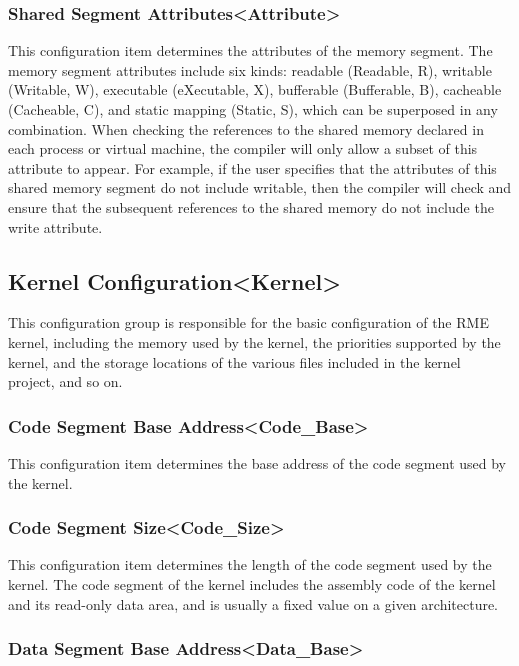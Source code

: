 \subsubsection{Shared Segment Attributes<Attribute>{}}\label{subsubsec:5-3-11-6}

This configuration item determines the attributes of the memory segment. The memory segment attributes include six kinds: readable (Readable, R), writable (Writable, W), executable (eXecutable, X), bufferable (Bufferable, B), cacheable (Cacheable, C), and static mapping (Static, S), which can be superposed in any combination. When checking the references to the shared memory declared in each process or virtual machine, the compiler will only allow a subset of this attribute to appear. For example, if the user specifies that the attributes of this shared memory segment do not include writable, then the compiler will check and ensure that the subsequent references to the shared memory do not include the write attribute.

\subsection{Kernel Configuration<Kernel>{}}\label{subsec:5-3-12}

This configuration group is responsible for the basic configuration of the RME kernel, including the memory used by the kernel, the priorities supported by the kernel, and the storage locations of the various files included in the kernel project, and so on.

\subsubsection{Code Segment Base Address<Code\_Base>{}}\label{subsubsec:5-3-12-1}

This configuration item determines the base address of the code segment used by the kernel.

\subsubsection{Code Segment Size<Code\_Size>{}}\label{subsubsec:5-3-12-2}

This configuration item determines the length of the code segment used by the kernel. The code segment of the kernel includes the assembly code of the kernel and its read-only data area, and is usually a fixed value on a given architecture.

\subsubsection{Data Segment Base Address<Data\_Base>{}}\label{subsubsec:5-3-12-3}

